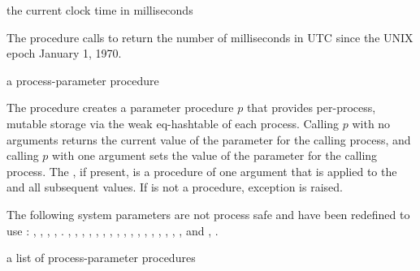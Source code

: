 \begin{procedure}
\end{procedure}
\returns{} the current clock time in milliseconds

The  procedure calls  to return
the number of milliseconds in UTC since the UNIX epoch January 1,
1970.

\begin{procedure}
\end{procedure}
\returns{} a process-parameter procedure

The  procedure creates a parameter
procedure $p$ that provides per-process, mutable storage via the
 weak eq-hashtable of each process. Calling $p$ with
no arguments returns the current value of the parameter for the
calling process, and calling $p$ with one argument sets the value of
the parameter for the calling process. The , if present,
is a procedure of one argument that is applied to the 
and all subsequent values. If  is not a procedure,
exception  is
raised.

The following system parameters are not process safe and have
been redefined to use :
,
,
,
,
.
,
,
,
,
,
,
,
,
,
,
,
,
,
,
,
,
, and
,
.

\begin{parameter}
\end{parameter}
\hasvalue{} a list of process-parameter procedures

